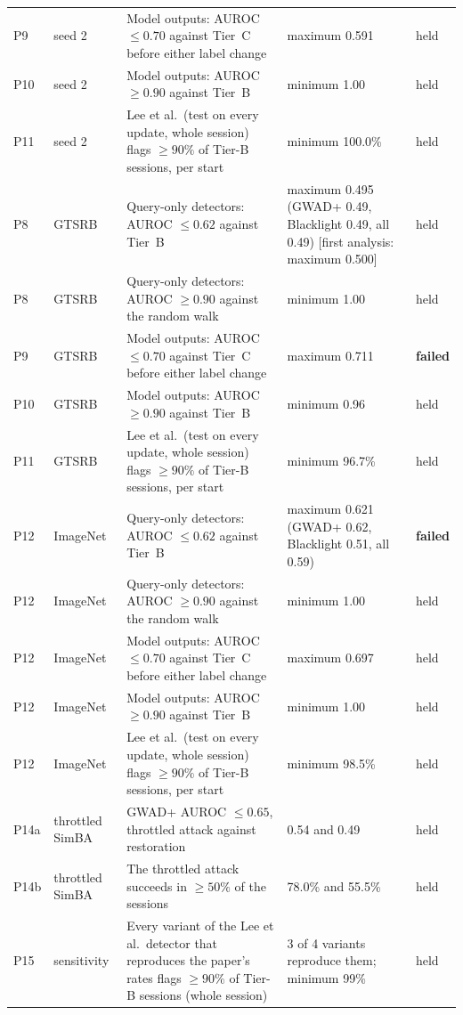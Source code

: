 \begin{footnotesize}
\begin{longtable}{L{0.9cm}L{1.9cm}L{5.0cm}L{3.4cm}L{1.1cm}}
P9 & seed 2 & Model outputs: AUROC $\le0.70$ against Tier~C before either label change & maximum 0.591 & held \\
P10 & seed 2 & Model outputs: AUROC $\ge0.90$ against Tier~B & minimum 1.00 & held \\
P11 & seed 2 & Lee et al.\ (test on every update, whole session) flags $\ge90\%$ of Tier-B sessions, per start & minimum 100.0\% & held \\
P8 & GTSRB & Query-only detectors: AUROC $\le0.62$ against Tier~B & maximum 0.495 (GWAD+ 0.49, Blacklight 0.49, all 0.49) [first analysis: maximum 0.500] & held \\
P8 & GTSRB & Query-only detectors: AUROC $\ge0.90$ against the random walk & minimum 1.00 & held \\
P9 & GTSRB & Model outputs: AUROC $\le0.70$ against Tier~C before either label change & maximum 0.711 & \textbf{failed} \\
P10 & GTSRB & Model outputs: AUROC $\ge0.90$ against Tier~B & minimum 0.96 & held \\
P11 & GTSRB & Lee et al.\ (test on every update, whole session) flags $\ge90\%$ of Tier-B sessions, per start & minimum 96.7\% & held \\
P12 & ImageNet & Query-only detectors: AUROC $\le0.62$ against Tier~B & maximum 0.621 (GWAD+ 0.62, Blacklight 0.51, all 0.59) & \textbf{failed} \\
P12 & ImageNet & Query-only detectors: AUROC $\ge0.90$ against the random walk & minimum 1.00 & held \\
P12 & ImageNet & Model outputs: AUROC $\le0.70$ against Tier~C before either label change & maximum 0.697 & held \\
P12 & ImageNet & Model outputs: AUROC $\ge0.90$ against Tier~B & minimum 1.00 & held \\
P12 & ImageNet & Lee et al.\ (test on every update, whole session) flags $\ge90\%$ of Tier-B sessions, per start & minimum 98.5\% & held \\
P14a & throttled SimBA & GWAD+ AUROC $\le0.65$, throttled attack against restoration & 0.54 and 0.49 & held \\
P14b & throttled SimBA & The throttled attack succeeds in $\ge50\%$ of the sessions & 78.0\% and 55.5\% & held \\
P15 & sensitivity & Every variant of the Lee et al.\ detector that reproduces the paper's rates flags $\ge90\%$ of Tier-B sessions (whole session) & 3 of 4 variants reproduce them; minimum 99\% & held \\

\end{longtable}
\end{footnotesize}
